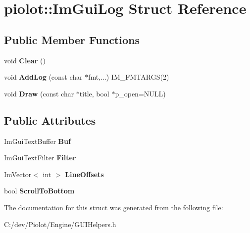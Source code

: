 \hypertarget{structpiolot_1_1_im_gui_log}{}\section{piolot\+:\+:Im\+Gui\+Log Struct Reference}
\label{structpiolot_1_1_im_gui_log}
\subsection*{Public Member Functions}
\begin{DoxyCompactItemize}
\item 
\mbox{\label{structpiolot_1_1_im_gui_log_ac7812f01c1da335a594a88e9b5d417f5}} 
void {\bfseries Clear} ()
\item 
\mbox{\label{structpiolot_1_1_im_gui_log_a29f527cccbe3946d24c8098ccf871699}} 
void {\bfseries Add\+Log} (const char $\ast$fmt,...) I\+M\+\_\+\+F\+M\+T\+A\+R\+GS(2)
\item 
\mbox{\label{structpiolot_1_1_im_gui_log_adaab8c65a0a76e8b434ae0edc4834a36}} 
void {\bfseries Draw} (const char $\ast$title, bool $\ast$p\+\_\+open=N\+U\+LL)
\end{DoxyCompactItemize}
\subsection*{Public Attributes}
\begin{DoxyCompactItemize}
\item 
\mbox{\label{structpiolot_1_1_im_gui_log_a0e64a8554125f6a918016325996c8a28}} 
Im\+Gui\+Text\+Buffer {\bfseries Buf}
\item 
\mbox{\label{structpiolot_1_1_im_gui_log_a2649c271372b11fbf1f8fd5ebdec6055}} 
Im\+Gui\+Text\+Filter {\bfseries Filter}
\item 
\mbox{\label{structpiolot_1_1_im_gui_log_a8c942c870cf5599fee50d7d7d30152b0}} 
Im\+Vector$<$ int $>$ {\bfseries Line\+Offsets}
\item 
\mbox{\label{structpiolot_1_1_im_gui_log_ae6efe1280bb054ee0651ad47251f4457}} 
bool {\bfseries Scroll\+To\+Bottom}
\end{DoxyCompactItemize}


The documentation for this struct was generated from the following file\+:\begin{DoxyCompactItemize}
\item 
C\+:/dev/\+Piolot/\+Engine/G\+U\+I\+Helpers.\+h\end{DoxyCompactItemize}
